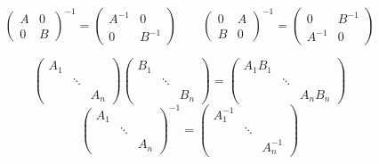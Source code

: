 \begin{equation}
    \begin{pmatrix}
        A & 0 \\
        0 & B
    \end{pmatrix}^{-1}
    =
    \begin{pmatrix}
        A^{-1} & 0      \\
        0      & B^{-1}
    \end{pmatrix}
    \qquad
    \begin{pmatrix}
        0 & A \\
        B & 0
    \end{pmatrix}^{-1}
    =
    \begin{pmatrix}
        0      & B^{-1} \\
        A^{-1} & 0
    \end{pmatrix}
\end{equation}

\begin{equation}
    \begin{pmatrix}
        A_1 &        &     \\
            & \ddots &     \\
            &        & A_n
    \end{pmatrix}
    \begin{pmatrix}
        B_1 &        &     \\
            & \ddots &     \\
            &        & B_n
    \end{pmatrix}
    =
    \begin{pmatrix}
        A_1B_1 &        &        \\
               & \ddots &        \\
               &        & A_nB_n
    \end{pmatrix}
\end{equation}
\begin{equation}
    \begin{pmatrix}
        A_1 &        &     \\
            & \ddots &     \\
            &        & A_n
    \end{pmatrix}^{-1}
    =
    \begin{pmatrix}
        A_1^{-1} &        &          \\
                 & \ddots &          \\
                 &        & A_n^{-1}
    \end{pmatrix}
\end{equation}

